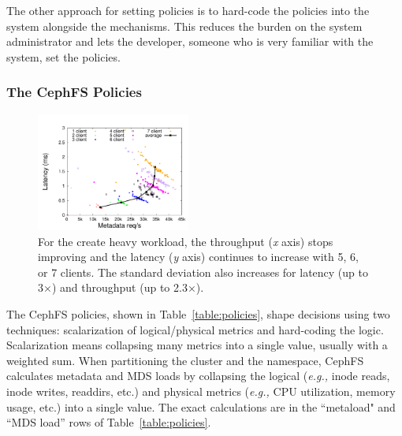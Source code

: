 The other approach for setting policies is to hard-code the policies into the system alongside the mechanisms. This reduces the burden on the system administrator and lets the developer, someone who is very familiar with the system, set the policies. 

\subsubsection*{The CephFS Policies}
\label{the-cephfs-policies}
\begin{figure}[tb]
	\centering
	\includegraphics[width=0.45\textwidth]{./chapters/mantle/creates-latency-thruput-clients.pdf}
    \caption{For the create heavy workload, the throughput ({\it x} axis) stops improving and the latency ({\it y} axis) continues to increase with 5, 6, or 7 clients. The standard deviation also increases for latency (up to 3\(\times\)) and throughput (up to 2.3\(\times\)). \label{figure:creates-latency-thruput-clients}} 
\end{figure}

The CephFS policies, shown in Table~\ref{table:policies}, shape decisions using two techniques: scalarization of logical/physical metrics and hard-coding the logic. Scalarization means collapsing many metrics into a single value, usually with a weighted sum. When partitioning the cluster and the namespace, CephFS calculates metadata and MDS loads by collapsing the logical ({\it e.g.,} inode reads, inode writes, readdirs, etc.) and physical metrics ({\it e.g.,} CPU utilization, memory usage, etc.) into a single value. The exact calculations are in the ``metaload" and ``MDS load'' rows of Table~\ref{table:policies}. 

